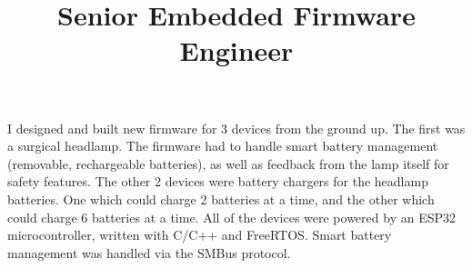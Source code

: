 \title{\textbf{Senior Embedded Firmware Engineer}}
\begin{position}
	I designed and built new firmware for 3 devices from the ground up. The
	first was a surgical headlamp. The firmware had to handle smart battery
	management (removable, rechargeable batteries), as well as feedback from the
	lamp itself for safety features. The other 2 devices were battery chargers for
	the headlamp batteries. One which could charge 2 batteries at a time, and the
	other which could charge 6 batteries at a time. All of the devices were powered
	by an ESP32 microcontroller, written with C/C++ and FreeRTOS. Smart battery
	management was handled via the SMBus protocol.
\end{position}

